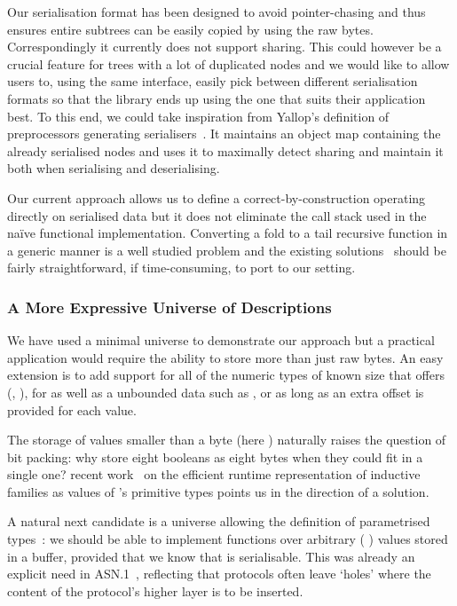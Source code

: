 Our serialisation format has been designed to avoid pointer-chasing and
thus ensures entire subtrees can be easily copied by using the raw bytes.
Correspondingly it currently does not support sharing.
%
This could however be a crucial feature for trees with a lot of duplicated
nodes and we would like to allow users to, using the same interface,
easily pick between different serialisation formats so that the library
ends up using the one that suits their application best.
%
To this end, we could take inspiration from Yallop's
definition of preprocessors generating serialisers~\citep{DBLP:conf/ml/Yallop07}.
It maintains an object map containing the already serialised nodes and uses it
to maximally detect sharing and maintain it both when serialising and deserialising.


Our current approach allows us to define a correct-by-construction
 operating directly on serialised data but it
does not eliminate the call stack used in the naïve functional
implementation.
%
Converting a fold to a tail recursive function in a generic manner
is a well studied problem and the existing
solutions~\citep{DBLP:conf/popl/McBride08,DBLP:conf/icfp/CortinasS18}
should be fairly straightforward, if time-consuming, to port to our setting.

\subsubsection{A More Expressive Universe of Descriptions}

We have used a minimal universe to demonstrate our approach but a practical
application would require the ability to store more than just raw bytes.
An easy extension is to add support for all of the numeric types of
known size that \idris{} offers
(, ),
for 
as well as a unbounded data such as , or 
as long as an extra offset is provided for each value.

The storage of values smaller than a byte (here ) naturally
raises the question of bit packing: why store eight booleans as eight bytes
when they could fit in a single one?
%
\iftoggle{BLIND}{Allais'}{Our} recent work~\citep{DBLP:conf/esop/Allais23}
on the efficient runtime representation of inductive families as values
of \idris{}'s primitive types points us in the direction of a solution.

A natural next candidate is a universe allowing the definition of parametrised
types~\citep{DBLP:conf/icfp/LohM11}: we should be able to implement functions over arbitrary
( ) values stored in a buffer,
provided that we know that  is serialisable.
%
This was already an explicit need in ASN.1~\citep{MANUAL:book/larmouth1999},
reflecting that protocols often leave `holes' where the content of
the protocol's higher layer is to be inserted.

